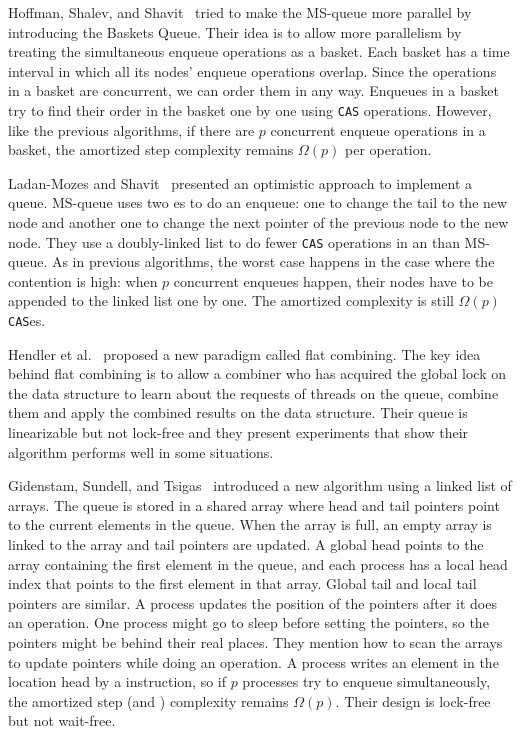 \documentclass[acmsmall,nonacm,anonymous]{acmart}
\newcommand{\nf}[1]{{\normalfont{\texttt{#1}}}}
\begin{document}
Hoffman, Shalev, and Shavit~\cite{DBLP:conf/opodis/HoffmanSS07} tried to make the MS-queue more parallel by introducing the Baskets Queue. Their idea is to allow more parallelism by treating the simultaneous enqueue operations as a basket. Each basket has a time interval in which all its nodes' enqueue operations overlap. Since the operations in a basket are concurrent, we can order them in any way. Enqueues in a basket try to find their order in the basket one by one using \texttt{CAS} operations. However, like the previous algorithms, if there are $p$ concurrent enqueue operations in a basket, the amortized step complexity remains $\Omega(p)$ per operation.

Ladan-Mozes and Shavit~\cite{DBLP:journals/dc/Ladan-MozesS08} presented an optimistic approach to implement a queue. MS-queue uses two \nf{CAS}es to do an enqueue: one to change the tail to the new node and another one to change the next pointer of the previous node to the new node. They use a doubly-linked list to do fewer \texttt{CAS} operations in an \nf{Enqueue} than MS-queue. As in  previous algorithms, the worst case happens in the case where the contention is high: when $p$ concurrent enqueues happen, their nodes have to be appended to the linked list one by one. The amortized complexity is still $\Omega(p)$ \texttt{CAS}es.

Hendler et al.~\cite{DBLP:conf/spaa/HendlerIST10} proposed a new paradigm called flat combining. The key idea behind flat combining is to allow a combiner who has acquired the global lock on the data structure to learn about the requests of threads on the queue, combine them and apply the combined results on the data structure. Their queue is linearizable but not lock-free and they present experiments that show their algorithm performs well in some situations.

Gidenstam, Sundell, and Tsigas~\cite{DBLP:conf/opodis/GidenstamST10} introduced a new algorithm using a linked list of arrays. The queue is stored in a shared array where head and tail pointers point to the current elements in the queue. When the array is full, an empty array is linked to the array and tail pointers are updated. A global head points to the array containing the first element in the queue, and each process has a local head index that points to the first element in that array. Global tail and local tail pointers are similar. A process updates the position of the pointers after it does an operation. One process might go to sleep before setting the pointers, so the pointers might be behind their real places. They mention how to scan the arrays to update pointers while doing an operation. A process writes an element in the location head by a \nf{CAS} instruction, so if $p$ processes try to enqueue simultaneously, the amortized step (and \nf{CAS}) complexity remains $\Omega(p)$. Their design is lock-free but not wait-free.
\end{document}
